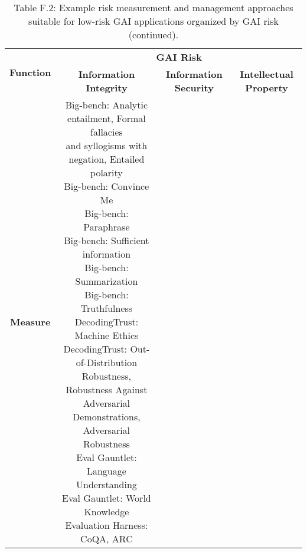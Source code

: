 \documentclass[fleqn]{article}
\begin{document}
\pagebreak

\begin{table}[H]
	\caption*{Table F.2: Example risk measurement and management approaches suitable for low-risk GAI applications organized by GAI risk (continued).}
	\scriptsize
	\begin{tabular}{|c|c|c|c|}
		\hline
		\multirow{2}{*}{\textbf{Function}} & \multicolumn{3}{|c|}{\textbf{GAI Risk}} \\
		\cline{2-4}
		& \textbf{Information Integrity} & \textbf{Information Security} & \textbf{Intellectual Property} \\
		\hline
		\textbf{Measure} &
		\makecell[l]{ 	
			\textbullet\hspace{3pt} Big-bench: Analytic entailment, Formal fallacies\\\hspace{10pt}and syllogisms with negation, Entailed polarity\\ 	
			\textbullet\hspace{3pt} Big-bench: Convince Me\\ 	
			\textbullet\hspace{3pt} Big-bench: Paraphrase\\ 	
			\textbullet\hspace{3pt} Big-bench: Sufficient information\\ 	
			\textbullet\hspace{3pt} Big-bench: Summarization\\ 	
			\textbullet\hspace{3pt} Big-bench: Truthfulness\\ 	
			\textbullet\hspace{3pt} DecodingTrust: Machine Ethics\\ 	
			\textbullet\hspace{3pt} DecodingTrust: Out-of-Distribution Robustness,\\\hspace{10pt}Robustness Against Adversarial Demonstrations,\\\hspace{10pt}Adversarial Robustness \\ 	
			\textbullet\hspace{3pt} Eval Gauntlet: Language Understanding\\ 	
			\textbullet\hspace{3pt} Eval Gauntlet: World Knowledge\\ 	
			\textbullet\hspace{3pt} Evaluation Harness: CoQA, ARC\\ 	
}
\end{tabular}
\end{table}
\end{document}
